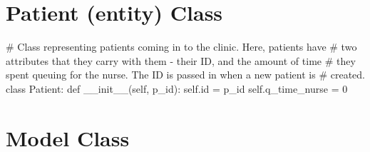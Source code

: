 \documentclass[
  letterpaper,
  DIV=11,
  numbers=noendperiod]{scrreprt}
\newenvironment{Shaded}{}{}
\newcommand{\BuiltInTok}[1]{\textcolor[rgb]{0.84,0.23,0.29}{#1}}
\newcommand{\CommentTok}[1]{\textcolor[rgb]{0.42,0.45,0.49}{#1}}
\newcommand{\DecValTok}[1]{\textcolor[rgb]{0.00,0.36,0.77}{#1}}
\newcommand{\FunctionTok}[1]{\textcolor[rgb]{0.44,0.26,0.76}{#1}}
\newcommand{\KeywordTok}[1]{\textcolor[rgb]{0.84,0.23,0.29}{#1}}
\newcommand{\NormalTok}[1]{\textcolor[rgb]{0.14,0.16,0.18}{#1}}
\newcommand{\OperatorTok}[1]{\textcolor[rgb]{0.14,0.16,0.18}{#1}}
\newcommand{\VariableTok}[1]{\textcolor[rgb]{0.89,0.38,0.04}{#1}}
\begin{document}
\section{Patient (entity) Class}\label{patient-entity-class}

\begin{Shaded}
\begin{Highlighting}[]
\CommentTok{\# Class representing patients coming in to the clinic.  Here, patients have}
\CommentTok{\# two attributes that they carry with them {-} their ID, and the amount of time}
\CommentTok{\# they spent queuing for the nurse.  The ID is passed in when a new patient is}
\CommentTok{\# created.}
\KeywordTok{class}\NormalTok{ Patient:}
    \KeywordTok{def} \FunctionTok{\_\_init\_\_}\NormalTok{(}\VariableTok{self}\NormalTok{, p\_id):}
        \VariableTok{self}\NormalTok{.}\BuiltInTok{id} \OperatorTok{=}\NormalTok{ p\_id}
        \VariableTok{self}\NormalTok{.q\_time\_nurse }\OperatorTok{=} \DecValTok{0}
\end{Highlighting}
\end{Shaded}

\section{Model Class}\label{model-class-1}
\end{document}

